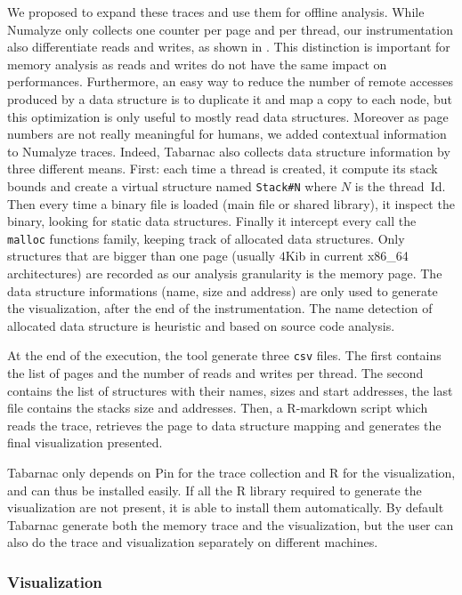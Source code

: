 We proposed to expand these traces and use them for offline analysis.
While \gls{Numalyze} only collects one counter per page and per thread, our instrumentation also differentiate reads and writes, as shown in .
This distinction is important for memory analysis as reads and writes do not have the same impact on performances.
Furthermore, an easy way to reduce the number of remote accesses produced by a data structure is to duplicate it and map a copy to each node, but this optimization is only useful to mostly read data structures.
Moreover as page numbers are not really meaningful for humans, we added contextual information to \gls{Numalyze} traces.
Indeed, \gls{Tabarnac} also collects data structure information by three different means.
First: each time a thread is created, it compute its stack bounds and create a virtual structure named \texttt{Stack\#N} where $N$ is the thread~Id.
Then every time a binary file is loaded (main file or shared library), it inspect the binary, looking for static data structures.
Finally it intercept every call the \texttt{malloc} functions family, keeping track of allocated data structures.
Only structures that are bigger than one page (usually $4$Kib in current x86\_64 architectures) are recorded as our analysis granularity is the memory page.
The data structure informations (name, size and address) are only used to generate the visualization, after the end of the instrumentation.
The name detection of allocated data structure is heuristic and based on source code analysis.

At the end of the execution, the tool generate three \texttt{csv} files.
The first contains the list of pages and the number of reads and writes per thread.
The second contains the list of structures with their names, sizes and start addresses, the last file contains the stacks size and addresses.
Then, a \gls{R-markdown} script which reads the trace, retrieves the page to data structure mapping and generates the final visualization presented.

\gls{Tabarnac} only depends on \gls{Pin} for the trace collection and \gls{R} for the visualization, and can thus be installed easily.
If all the R library required to generate the visualization are not present, it is able to install them automatically.
By default \gls{Tabarnac} generate both the memory trace and the visualization, but the user can also do the trace and visualization separately on different machines.

\subsubsection{Visualization}

